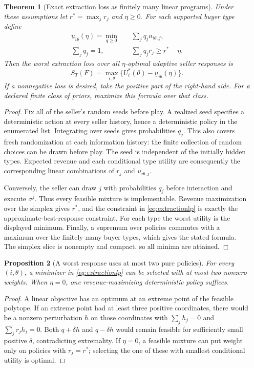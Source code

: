 \documentclass[11pt]{article}
\newtheorem{theorem}{Theorem}
\newtheorem{proposition}[theorem]{Proposition}
\theoremstyle{definition}
\theoremstyle{remark}
\begin{document}
\begin{theorem}[Exact extraction loss as finitely many linear programs]
Under these assumptions let $r^*=\max_j r_j$ and $\eta\ge0$. For each supported buyer type define
\begin{align}
 \underline u_{i\theta}(\eta)=\min_{q\ge0}\quad&\sum_jq_j u_{i\theta,j},\label{eq:extractionlp}\\
 \sum_jq_j=1,\qquad&\sum_jq_jr_j\ge r^*-\eta.\nonumber
\end{align}
Then the worst extraction loss over all $\eta$-optimal adaptive seller responses is
\[
 S_T(F)=\max_{i,\theta}\{U_i^*(\theta)-\underline u_{i\theta}(\eta)\}.
\]
If a nonnegative loss is desired, take the positive part of the right-hand side. For a declared finite class of priors, maximize this formula over that class.
\end{theorem}
\begin{proof}
Fix all of the seller's random seeds before play. A realized seed specifies a deterministic action at every seller history, hence a deterministic policy in the enumerated list. Integrating over seeds gives probabilities $q_j$. This also covers fresh randomization at each information history: the finite collection of random choices can be drawn before play. The seed is independent of the initially hidden types. Expected revenue and each conditional type utility are consequently the corresponding linear combinations of $r_j$ and $u_{i\theta,j}$.

Conversely, the seller can draw $j$ with probabilities $q_j$ before interaction and execute $\sigma^j$. Thus every feasible mixture is implementable. Revenue maximization over the simplex gives $r^*$, and the constraint in \eqref{eq:extractionlp} is exactly the approximate-best-response constraint. For each type the worst utility is the displayed minimum. Finally, a supremum over policies commutes with a maximum over the finitely many buyer types, which gives the stated formula. The simplex slice is nonempty and compact, so all minima are attained.
\end{proof}

\begin{proposition}[A worst response uses at most two pure policies]
For every $(i,\theta)$, a minimizer in \eqref{eq:extractionlp} can be selected with at most two nonzero weights. When $\eta=0$, one revenue-maximizing deterministic policy suffices.
\end{proposition}
\begin{proof}
A linear objective has an optimum at an extreme point of the feasible polytope. If an extreme point had at least three positive coordinates, there would be a nonzero perturbation $h$ on those coordinates with $\sum_jh_j=0$ and $\sum_jr_jh_j=0$. Both $q+\delta h$ and $q-\delta h$ would remain feasible for sufficiently small positive $\delta$, contradicting extremality. If $\eta=0$, a feasible mixture can put weight only on policies with $r_j=r^*$; selecting the one of these with smallest conditional utility is optimal.
\end{proof}
\end{document}

